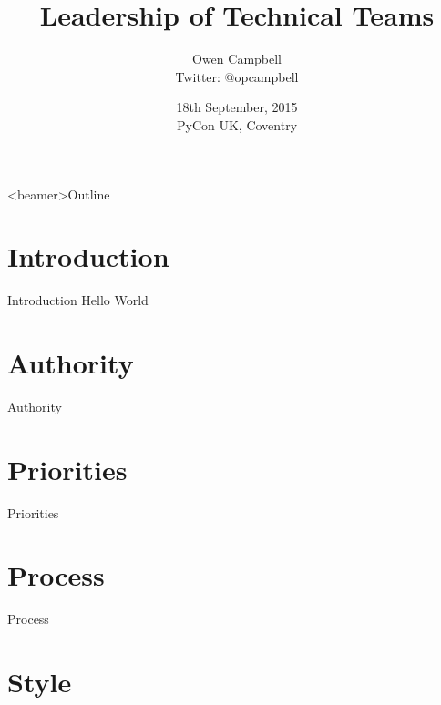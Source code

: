 \documentclass{beamer}
\title{Leadership of Technical Teams}
\author{
  Owen Campbell\\
  \vspace{1cm}
  Twitter: @opcampbell\\
}
\date[PyCon UK 2015]{18th September, 2015\\PyCon UK, Coventry}
\begin{document}
\begin{frame}
  \titlepage{}
\end{frame}

{
  \begin{frame}<beamer>{Outline}
    \tableofcontents
  \end{frame}
}

  \section{Introduction}

    \begin{frame}{Introduction}
      Hello World
    \end{frame}


  \section{Authority}

    \begin{frame}{Authority}
    \end{frame}

  \section{Priorities}

    \begin{frame}{Priorities}
    \end{frame}

  \section{Process}

    \begin{frame}{Process}
    \end{frame}

  \section{Style}
\end{document}
